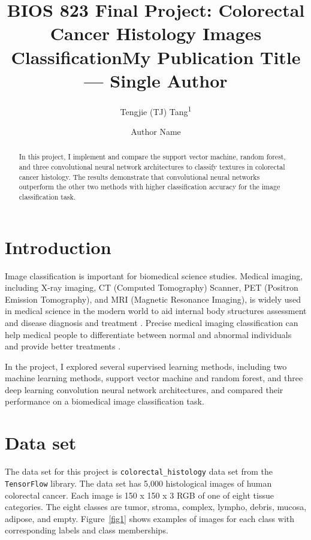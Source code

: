 \documentclass[letterpaper]{article} %
\title{BIOS 823 Final Project: Colorectal Cancer Histology Images Classification}
\author{
    Tengjie (TJ) Tang\textsuperscript{\rm 1}
}
\title{My Publication Title --- Single Author}
\author {
    Author Name
}
\begin{document}
\maketitle

\begin{abstract}

In this project, I implement and compare the support vector machine, random forest, and three convolutional neural network architectures to classify textures in colorectal cancer histology. The results demonstrate that convolutional neural networks outperform the other two methods with higher classification accuracy for the image classification task. 

\end{abstract}

\section{Introduction}

Image classification is important for biomedical science studies. Medical imaging, including X-ray imaging, CT (Computed Tomography) Scanner, PET (Positron Emission Tomography), and MRI (Magnetic Resonance Imaging), is widely used in medical science in the modern world to aid internal body structures assessment and disease diagnosis and treatment \cite{Bajaj2018, ZHANG2019354, TchitoTchapga2021BiomedicalIC, hussain2022modern}. Precise medical imaging classification can help medical people to differentiate between normal and abnormal individuals and provide better treatments \cite{9669323}. 

In the project, I explored several supervised learning methods, including two machine learning methods, support vector machine and random forest, and three deep learning convolution neural network architectures, and compared their performance on a biomedical image classification task.

\section{Data set}

The data set for this project is \texttt{colorectal\_histology} \cite{kather2016multi} data set from the \texttt{TensorFlow} \cite{tensorflow2015-whitepaper} library. The data set has 5,000 histological images of human colorectal cancer. Each image is 150 x 150 x 3 RGB of one of eight tissue categories. The eight classes are tumor, stroma, complex, lympho, debris, mucosa, adipose, and empty. Figure~\ref{fig1} shows examples of images for each class with corresponding labels and class memberships.
\end{document}

